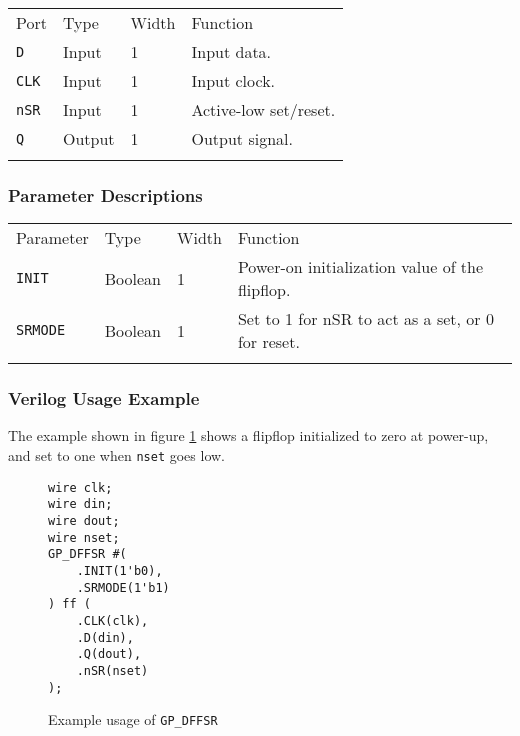 \documentclass[11pt]{article}
\newcommand{\tokenstyle}[1]{\texttt{#1}}
\newcommand{\wirestyle}[1]{\texttt{#1}}
\newcommand{\whenstyle}[1]{{\fontseries{sb}\selectfont#1}}
\newcommand{\thinhline}{\Xhline{1\arrayrulewidth}}
\newcommand{\thickhline}{\Xhline{2.5\arrayrulewidth}}
\begin{document}
\begin{tabularx}{\textwidth}{lllX}
\thinhline
\whenstyle{Port} & \whenstyle{Type} & \whenstyle{Width} & \whenstyle{Function} \\
\thickhline
\tokenstyle{D} & Input & 1 & Input data. \\
\thinhline
\tokenstyle{CLK} & Input & 1 & Input clock. \\
\thinhline
\tokenstyle{nSR} & Input & 1 & Active-low set/reset. \\
\thinhline
\tokenstyle{Q} & Output & 1 & Output signal. \\
\thinhline
\end{tabularx}

\subsubsection{Parameter Descriptions}

\begin{tabularx}{\textwidth}{lllX}
\thinhline
\whenstyle{Parameter} & \whenstyle{Type} & \whenstyle{Width} & \whenstyle{Function} \\
\thickhline
\tokenstyle{INIT} & Boolean & 1 & Power-on initialization value of the flipflop. \\
\thinhline
\tokenstyle{SRMODE} & Boolean & 1 & Set to 1 for nSR to act as a set, or 0 for reset. \\
\thinhline
\end{tabularx}

\subsubsection{Verilog Usage Example}

The example shown in figure \ref{gp-dffsr-example} shows a flipflop initialized to zero at power-up, and set to one
when \wirestyle{nset} goes low.

\begin{figure}[h]
\begin{lstlisting}
wire clk;
wire din;
wire dout;
wire nset;
GP_DFFSR #(
	.INIT(1'b0),
	.SRMODE(1'b1)
) ff (
	.CLK(clk),
	.D(din),
	.Q(dout),
	.nSR(nset)
);
\end{lstlisting}
\caption{Example usage of \tokenstyle{GP\_DFFSR}}
\label{gp-dffsr-example}
\end{figure}

\end{document}

